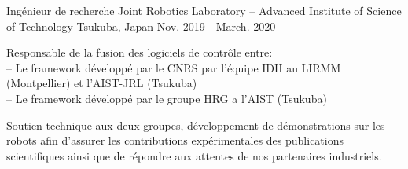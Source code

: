 
\begin{cventries}

  \cventry
    {Ingénieur de recherche} %
    {Joint Robotics Laboratory -- Advanced Institute of Science of Technology} %
    {Tsukuba, Japan} %
    {Nov. 2019 - March. 2020} %
    {
      \begin{cvitems} %
        \item Responsable de la fusion des logiciels de contrôle entre:\\
          -- Le framework  développé par le CNRS par l'équipe IDH au LIRMM (Montpellier) et l'AIST-JRL (Tsukuba)\\
          -- Le framework  développé par le groupe HRG a l'AIST (Tsukuba)
        \item Soutien technique aux deux groupes, développement de démonstrations sur les robots afin d'assurer les contributions expérimentales des publications scientifiques ainsi que de répondre aux attentes de nos partenaires industriels.
      \end{cvitems}
    }


\end{cventries}
